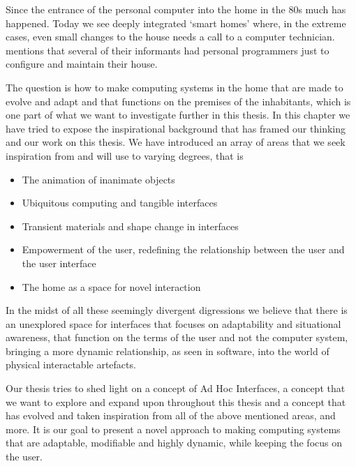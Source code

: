 Since the entrance of the personal computer into the home in the 80s much has happened.
Today we see deeply integrated `smart homes' where, in the extreme cases, even small changes to the house needs a call to a computer technician.
\citet{lynggaard2012had} mentions that several of their informants had personal programmers just to configure and maintain their house.

The question is how to make computing systems in the home that are made to evolve and adapt and that functions on the premises of the inhabitants, which is one part of what we want to investigate further in this thesis.  
\blank
In this chapter we have tried to expose the inspirational background that has framed our thinking and our work on this thesis. 
We have introduced an array of areas that we seek inspiration from and will use to varying degrees, that is

\begin{itemize}
\item{The animation of inanimate objects}
\item{Ubiquitous computing and tangible interfaces}
\item{Transient materials and shape change in interfaces}
\item{Empowerment of the user, redefining the relationship between the user and the user interface}
\item{The home as a space for novel interaction}
\end{itemize}

In the midst of all these seemingly divergent digressions we believe that there is an unexplored space for interfaces that focuses on adaptability and situational awareness, that function on the terms of the user and not the computer system, bringing a more dynamic relationship, as seen in software, into the world of physical interactable artefacts.

Our thesis tries to shed light on a concept of Ad Hoc Interfaces, a concept that we want to explore and expand upon throughout this thesis and a concept that has evolved and taken inspiration from all of the above mentioned areas, and more. 
It is our goal to present a novel approach to making computing systems that are adaptable, modifiable and highly dynamic, while keeping the focus on the user. 